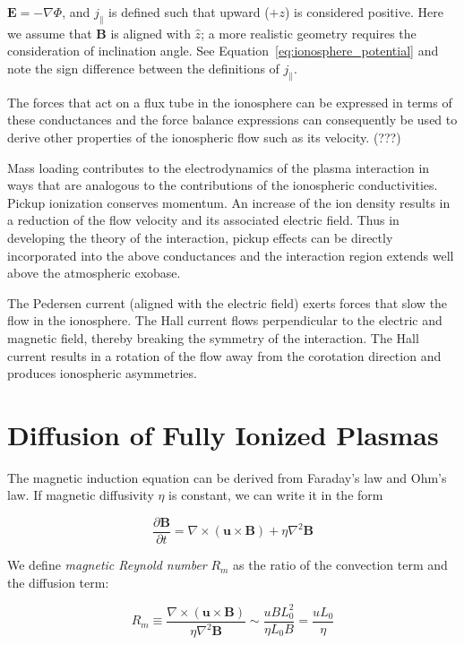 \documentclass[
  notoc %
]{tufte-book}
\begin{document}
\(\mathbf{E}=-\nabla\Phi\), and \(j_\parallel\) is defined such that
upward (\(+z\)) is considered positive. Here we assume that
\(\mathbf{B}\) is aligned with \(\hat{z}\); a more realistic geometry
requires the consideration of inclination angle. See
Equation~\ref{eq:ionosphere_potential} and note the sign difference
between the definitions of \(j_\parallel\).

The forces that act on a flux tube in the ionosphere can be expressed in
terms of these conductances and the force balance expressions can
consequently be used to derive other properties of the ionospheric flow
such as its velocity. (???)

Mass loading contributes to the electrodynamics of the plasma
interaction in ways that are analogous to the contributions of the
ionospheric conductivities. Pickup ionization conserves momentum. An
increase of the ion density results in a reduction of the flow velocity
and its associated electric field. Thus in developing the theory of the
interaction, pickup effects can be directly incorporated into the above
conductances and the interaction region extends well above the
atmospheric exobase.

The Pedersen current (aligned with the electric field) exerts forces
that slow the flow in the ionosphere. The Hall current flows
perpendicular to the electric and magnetic field, thereby breaking the
symmetry of the interaction. The Hall current results in a rotation of
the flow away from the corotation direction and produces ionospheric
asymmetries.

\hypertarget{diffusion-of-fully-ionized-plasmas}{%
\section{Diffusion of Fully Ionized
Plasmas}\label{diffusion-of-fully-ionized-plasmas}}

The magnetic induction equation can be derived from Faraday's law and
Ohm's law. If magnetic diffusivity \(\eta\) is constant, we can write it
in the form

\[
\frac{\partial\mathbf{B}}{\partial t}=\nabla\times(\mathbf{u}\times\mathbf{B})+\eta\nabla^2\mathbf{B}
\]

We define \emph{magnetic Reynold number} \(R_m\) as the ratio of the
convection term and the diffusion term:

\[
R_m\equiv \frac{\nabla\times(\mathbf{u}\times\mathbf{B})}{\eta\nabla^2\mathbf{B}}\sim \frac{uBL_0^2}{\eta L_0 B}=\frac{u L_0}{\eta}
\]
\end{document}
